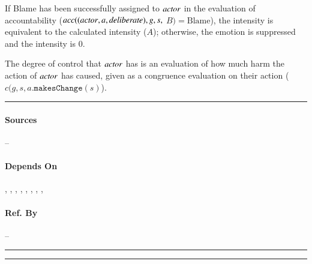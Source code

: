 If Blame has been successfully assigned to $\mathit{actor}$ in the evaluation of
accountability ($acc((\mathit{actor}, a,\allowbreak \mathit{deliberate}), g, s,$ $B) = 
\text{Blame}$), the intensity is equivalent to the calculated intensity ($A$); 
otherwise, the emotion is suppressed and the intensity is $0$.

The degree of control that $\mathit{actor}$ has is an evaluation of how much harm the
action of $\mathit{actor}$ has caused, given as a congruence evaluation on their
action ($c(g, s, a.\mathtt{makesChange}(s)$). \\\hrule

\paragraph{Sources} --

\paragraph{Depends On} , , 
, , , , 
, , 

\paragraph{Ref. By} -- \\\hrule\vspace{0.5mm}\hrule